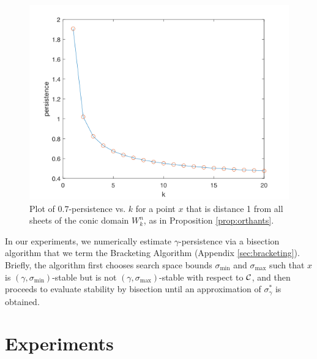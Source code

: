 \begin{figure}[h!]
\centering
\includegraphics[width=.4\textwidth]{c2_figures/Persistence.png}
\caption{Plot of $0.7$-persistence vs. $k$ for a point $x$ that is distance 1 from all sheets of the conic domain $W_k^n$, as in Proposition \ref{prop:orthants}.}\label{FIG:Persistence}
\end{figure}


In our experiments, we numerically estimate $\gamma$-persistence via a bisection algorithm that we term the Bracketing Algorithm (Appendix \ref{sec:bracketing}).  Briefly, the algorithm first chooses search space bounds $\sigma_{\min}$ and $\sigma_{\max}$ such that $x$ is  $(\gamma,\sigma_{\min})$-stable but is not $(\gamma,\sigma_{\max})$-stable with respect to $\mathcal{C}$, and then proceeds to evaluate stability by bisection until an approximation of $\sigma_\gamma^*$ is obtained.






\section{Experiments} \label{sec:experiments}



